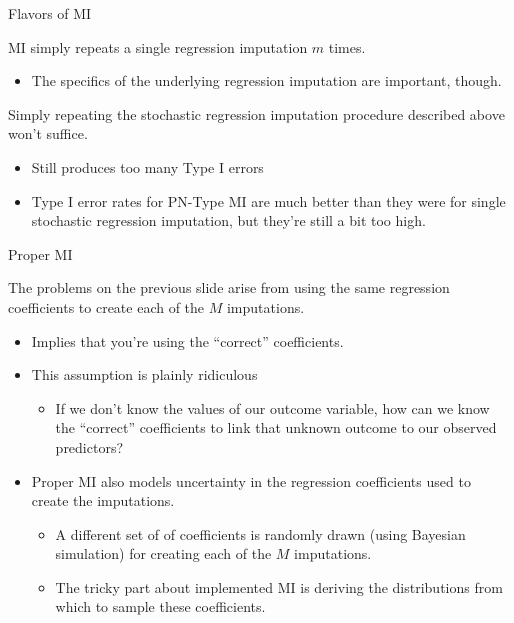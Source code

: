 \documentclass[table]{beamer}
\begin{document}
\begin{frame}{Flavors of MI}
  
  MI simply repeats a single regression imputation $m$ times.
  \begin{itemize}
    \item The specifics of the underlying regression imputation are important, though.
  \end{itemize}
  \vspace{6pt}
  Simply repeating the stochastic regression imputation procedure described above won't suffice.
  \begin{itemize}
    \item Still produces too many Type I errors
  \end {itemize}
    


\vspace{-12pt}
\begin{itemize}
  \item Type I error rates for PN-Type MI are much better than they
    were for single stochastic regression imputation, but they're
    still a bit too high.
\end{itemize}

\end{frame}



\begin{frame}{Proper MI}
  
  The problems on the previous slide arise from using the same
  regression coefficients to create each of the $M$ imputations.
  \begin{itemize}
  \item Implies that you're using the ``correct'' coefficients.
    \vspace{6pt}
  \item This assumption is plainly ridiculous
    \begin{itemize}
    \item If we don't know the values of our outcome variable, how can
      we know the ``correct'' coefficients to link that unknown outcome
      to our observed predictors?
    \end{itemize}
    \vspace{6pt}
    \pause
  \item Proper MI also models uncertainty in the regression
    coefficients used to create the imputations.
    \begin{itemize}
    \item A different set of of coefficients is randomly drawn (using
      Bayesian simulation) for creating each of the $M$ imputations.
    \item The tricky part about implemented MI is deriving the
      distributions from which to sample these coefficients.
    \end{itemize}
  \end{itemize}
  
\end{frame}
\end{document}

